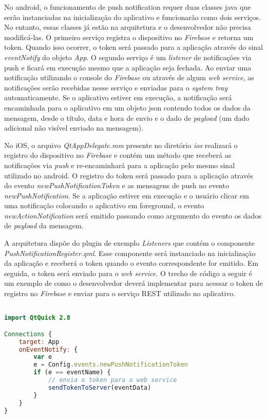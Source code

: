 No android, o funcionamento de push notification requer duas classes java que serão instanciadas na inicialização do aplicativo e funcionarão como dois serviços. No entanto, essas classes já estão na arquitetura e o desenvolvedor não precisa modificá-las. O primeiro serviço registra o dispositivo no \textit{Firebase} e retorna um token. Quando isso ocorrer, o token será passado para a aplicação através do sinal \textit{eventNotify} do objeto \textit{App}. O segundo serviço é um \textit{listener} de notificações via push e ficará em execução mesmo que a aplicação seja fechada. Ao enviar uma notificação utilizando o console do \textit{Firebase} ou através de algum \textit{web service}, as notificações serão recebidas nesse serviço e enviadas para o \textit{system tray} automaticamente. Se o aplicativo estiver em execução, a notificação será encaminhada para o aplicativo em um objeto json contendo todos os dados da mensagem, desde o título, data e hora de envio e o dado de \textit{payload} (um dado adicional não visível enviado na mensagem).\par

No iOS, o arquivo \textit{QtAppDelegate.mm} presente no diretório \textit{ios} realizará o registro do dispositivo no \textit{Firebase} e contém um método que receberá as notificações via \textit{push} e re-encaminhará para a aplicação pelo mesmo sinal utilizado no android. O registro do token será passado para a aplicação através do evento \textit{newPushNotificationToken} e as mensagens de push no evento \textit{newPushNotification}. Se a aplicação estiver em execução e o usuário clicar em uma notificação colocando o aplicativo em foreground, o evento \textit{newActionNotification} será emitido passando como argumento do evento os dados de \textit{payload} da mensagem.\par

A arquitetura dispõe do plugin de exemplo \textit{Listeners} que contém o componente \textit{PushNotificationRegister.qml}. Esse componente será instanciado na inicialização da aplicação e receberá o token quando o evento correspondente for emitido. Em seguida, o token será enviado para o \textit{web service}. O trecho de código a seguir é um exemplo de como o desenvolvedor deverá implementar para acessar o token de registro no \textit{Firebase} e enviar para o serviço REST utilizado no aplicativo.

\begin{center}
\begin{lstlisting}[language=qml]

import QtQuick 2.8

Connections {
    target: App
    onEventNotify: {
		var e
		e = Config.events.newPushNotificationToken
        if (e == eventName) {
            // envia o token para o web service
            sendTokenToServer(eventData)
        }
    }
}
\end{lstlisting}
\end{center}



